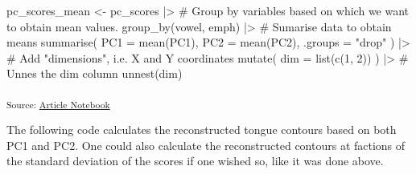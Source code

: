 \documentclass[
  man,
  longtable,
  nolmodern,
  notxfonts,
  notimes,
  colorlinks=true,linkcolor=blue,citecolor=blue,urlcolor=blue]{apa7}
\newenvironment{Shaded}{\begin{snugshade}}{\end{snugshade}}
\newcommand{\AttributeTok}[1]{\textcolor[rgb]{0.40,0.45,0.13}{#1}}
\newcommand{\CommentTok}[1]{\textcolor[rgb]{0.37,0.37,0.37}{#1}}
\newcommand{\DecValTok}[1]{\textcolor[rgb]{0.68,0.00,0.00}{#1}}
\newcommand{\FunctionTok}[1]{\textcolor[rgb]{0.28,0.35,0.67}{#1}}
\newcommand{\NormalTok}[1]{\textcolor[rgb]{0.00,0.23,0.31}{#1}}
\newcommand{\OtherTok}[1]{\textcolor[rgb]{0.00,0.23,0.31}{#1}}
\newcommand{\SpecialCharTok}[1]{\textcolor[rgb]{0.37,0.37,0.37}{#1}}
\newcommand{\StringTok}[1]{\textcolor[rgb]{0.13,0.47,0.30}{#1}}
\begin{document}
\begin{Shaded}
\begin{Highlighting}[]
\NormalTok{pc\_scores\_mean }\OtherTok{\textless{}{-}}\NormalTok{ pc\_scores }\SpecialCharTok{|\textgreater{}}
  \CommentTok{\# Group by variables based on which we want to obtain mean values.}
  \FunctionTok{group\_by}\NormalTok{(vowel, emph) }\SpecialCharTok{|\textgreater{}} 
  \CommentTok{\# Sumarise data to obtain means}
  \FunctionTok{summarise}\NormalTok{(}
    \AttributeTok{PC1 =} \FunctionTok{mean}\NormalTok{(PC1),}
    \AttributeTok{PC2 =} \FunctionTok{mean}\NormalTok{(PC2),}
    \AttributeTok{.groups =} \StringTok{"drop"}
\NormalTok{  ) }\SpecialCharTok{|\textgreater{}} 
  \CommentTok{\# Add "dimensions", i.e. X and Y coordinates}
  \FunctionTok{mutate}\NormalTok{(}
    \AttributeTok{dim =} \FunctionTok{list}\NormalTok{(}\FunctionTok{c}\NormalTok{(}\DecValTok{1}\NormalTok{, }\DecValTok{2}\NormalTok{))}
\NormalTok{  ) }\SpecialCharTok{|\textgreater{}} 
  \CommentTok{\# Unnes the dim column}
  \FunctionTok{unnest}\NormalTok{(dim)}
\end{Highlighting}
\end{Shaded}

\textsubscript{Source:
\href{https://stefanocoretta.github.io/mv_uti/index.qmd.html}{Article
Notebook}}

The following code calculates the reconstructed tongue contours based on
both PC1 and PC2. One could also calculate the reconstructed contours at
factions of the standard deviation of the scores if one wished so, like
it was done above.
\end{document}
